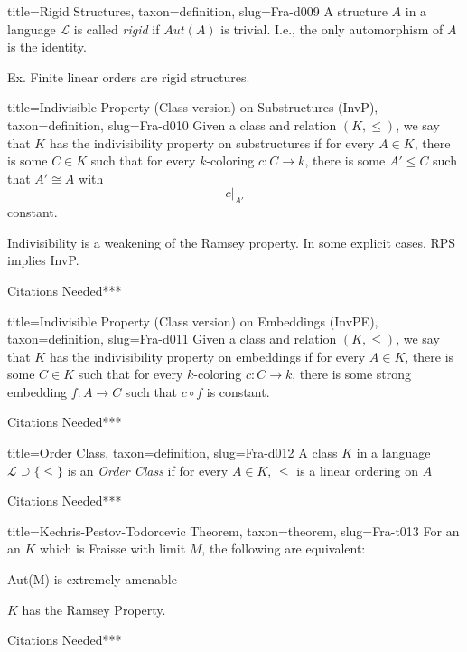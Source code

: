 \documentclass[a4paper]{article}
\begin{document}
\begin{tree}{title={Rigid Structures}, taxon={definition}, slug={Fra-d009}}
A structure \(A\) in a language \(\mathcal {L}\) is called \emph{rigid} if \(Aut(A)\) is trivial. I.e., the only automorphism of \(A\) is the identity.\par{Ex. Finite linear orders are rigid structures.}
\end{tree}

\begin{tree}{title={Indivisible Property (Class version) on Substructures (InvP)}, taxon={definition}, slug={Fra-d010}}
Given a class and relation \((K, \leq )\), we say that \(K\) has the indivisibility property on substructures if for every \(A  \in  K\), there is some \(C \in  K\)
such that for every \(k\)-coloring \(c: C \rightarrow  k\), there is some \(A' \leq  C\) such that \(A'  \cong  A\) with \[c|_{A'}\] constant.\par{Indivisibility is a weakening of the Ramsey property. In some explicit cases, RPS implies InvP.}\par{Citations Needed***}
\end{tree}

\begin{tree}{title={Indivisible Property (Class version) on Embeddings (InvPE)}, taxon={definition}, slug={Fra-d011}}
Given a class and relation \((K, \leq )\), we say that \(K\) has the indivisibility property on embeddings if for every \(A  \in  K\), there is some \(C \in  K\)
such that for every \(k\)-coloring \(c: C \rightarrow  k\), there is some strong embedding \(f:A \rightarrow  C\) such that \(c \circ  f\) is constant.\par{Citations Needed***}
\end{tree}

\begin{tree}{title={Order Class}, taxon={definition}, slug={Fra-d012}}
A class \(K\) in a language \(\mathcal {L}  \supseteq   \{ \leq \}\) is an \emph{Order Class} if for every \(A \in  K\), \(\leq\) is a linear ordering on \(A\)\par{Citations Needed***}
\end{tree}

\begin{tree}{title={Kechris-Pestov-Todorcevic Theorem}, taxon={theorem}, slug={Fra-t013}}
For an an  \(K\) which is Fraisse with limit \(M\), the following are equivalent:\par{Aut(M) is extremely amenable}\par{\(K\) has the Ramsey Property.}\par{Citations Needed***}
\end{tree}

\printbibliography
\end{document}
